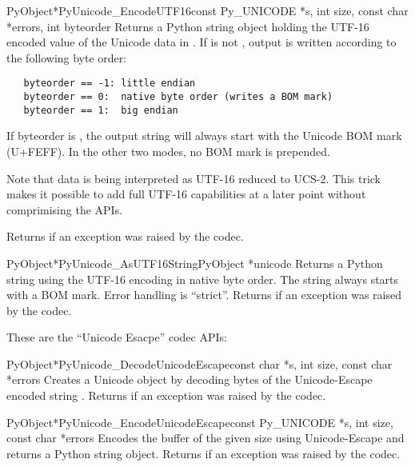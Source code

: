\begin{cfuncdesc}{PyObject*}{PyUnicode_EncodeUTF16}{const Py_UNICODE *s,
                                               int size,
                                               const char *errors,
                                               int byteorder}
  Returns a Python string object holding the UTF-16 encoded value of
  the Unicode data in .  If  is not ,
  output is written according to the following byte order:

\begin{verbatim}
   byteorder == -1: little endian
   byteorder == 0:  native byte order (writes a BOM mark)
   byteorder == 1:  big endian
\end{verbatim}

  If byteorder is , the output string will always start with
  the Unicode BOM mark (U+FEFF). In the other two modes, no BOM mark
  is prepended.

  Note that  data is being interpreted as UTF-16
  reduced to UCS-2. This trick makes it possible to add full UTF-16
  capabilities at a later point without comprimising the APIs.

  Returns \NULL{} if an exception was raised by the codec.
\end{cfuncdesc}

\begin{cfuncdesc}{PyObject*}{PyUnicode_AsUTF16String}{PyObject *unicode}
  Returns a Python string using the UTF-16 encoding in native byte
  order. The string always starts with a BOM mark.  Error handling is
  ``strict''.  Returns \NULL{} if an exception was raised by the
  codec.
\end{cfuncdesc}


These are the ``Unicode Esacpe'' codec APIs:

\begin{cfuncdesc}{PyObject*}{PyUnicode_DecodeUnicodeEscape}{const char *s,
                                               int size,
                                               const char *errors}
  Creates a Unicode object by decoding  bytes of the
  Unicode-Escape encoded string .  Returns \NULL{} if an
  exception was raised by the codec.
\end{cfuncdesc}

\begin{cfuncdesc}{PyObject*}{PyUnicode_EncodeUnicodeEscape}{const Py_UNICODE *s,
                                               int size,
                                               const char *errors}
  Encodes the  buffer of the given size using
  Unicode-Escape and returns a Python string object.  Returns \NULL{}
  if an exception was raised by the codec.
\end{cfuncdesc}

